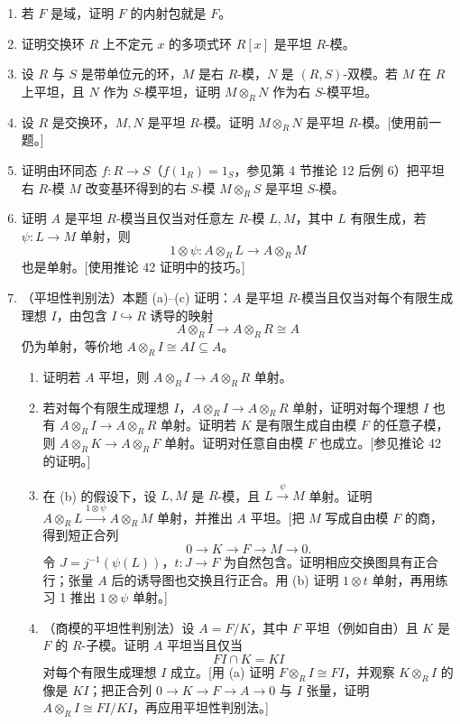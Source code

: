 \begin{enumerate}[label=\arabic*.]
	\item 若 $F$ 是域，证明 $F$ 的内射包就是 $F$。
	\item 证明交换环 $R$ 上不定元 $x$ 的多项式环 $R[x]$ 是平坦 $R$-模。
	\item 设 $R$ 与 $S$ 是带单位元的环，$M$ 是右 $R$-模，$N$ 是 $(R,S)$-双模。若 $M$ 在 $R$ 上平坦，且 $N$ 作为 $S$-模平坦，证明 $M\otimes_RN$ 作为右 $S$-模平坦。
	\item 设 $R$ 是交换环，$M,N$ 是平坦 $R$-模。证明 $M\otimes_RN$ 是平坦 $R$-模。[使用前一题。]
	\item 证明由环同态 $f:R\to S$（$f(1_R)=1_S$，参见第 4 节推论 12 后例 6）把平坦右 $R$-模 $M$ 改变基环得到的右 $S$-模 $M\otimes_RS$ 是平坦 $S$-模。
	\item 证明 $A$ 是平坦 $R$-模当且仅当对任意左 $R$-模 $L,M$，其中 $L$ 有限生成，若 $\psi:L\to M$ 单射，则
	\[
	1\otimes\psi:A\otimes_RL\longrightarrow A\otimes_RM
	\]
	也是单射。[使用推论 42 证明中的技巧。]
	\item （平坦性判别法）本题 (a)--(c) 证明：$A$ 是平坦 $R$-模当且仅当对每个有限生成理想 $I$，由包含 $I\hookrightarrow R$ 诱导的映射
	\[
	A\otimes_RI\longrightarrow A\otimes_RR\cong A
	\]
	仍为单射，等价地 $A\otimes_RI\cong AI\subseteq A$。
	\begin{enumerate}[label=(\alph*)]
		\item 证明若 $A$ 平坦，则 $A\otimes_RI\to A\otimes_RR$ 单射。
		\item 若对每个有限生成理想 $I$，$A\otimes_RI\to A\otimes_RR$ 单射，证明对每个理想 $I$ 也有 $A\otimes_RI\to A\otimes_RR$ 单射。证明若 $K$ 是有限生成自由模 $F$ 的任意子模，则 $A\otimes_RK\to A\otimes_RF$ 单射。证明对任意自由模 $F$ 也成立。[参见推论 42 的证明。]
		\item 在 (b) 的假设下，设 $L,M$ 是 $R$-模，且 $L\xrightarrow{\psi}M$ 单射。证明 $A\otimes_RL\xrightarrow{1\otimes\psi}A\otimes_RM$ 单射，并推出 $A$ 平坦。[把 $M$ 写成自由模 $F$ 的商，得到短正合列
		\[
		0\to K\to F\to M\to0.
		\]
		令 $J=j^{-1}(\psi(L))$，$t:J\to F$ 为自然包含。证明相应交换图具有正合行；张量 $A$ 后的诱导图也交换且行正合。用 (b) 证明 $1\otimes t$ 单射，再用练习 1 推出 $1\otimes\psi$ 单射。]
		\item （商模的平坦性判别法）设 $A=F/K$，其中 $F$ 平坦（例如自由）且 $K$ 是 $F$ 的 $R$-子模。证明 $A$ 平坦当且仅当
		\[
		FI\cap K=KI
		\]
		对每个有限生成理想 $I$ 成立。[用 (a) 证明 $F\otimes_RI\cong FI$，并观察 $K\otimes_RI$ 的像是 $KI$；把正合列 $0\to K\to F\to A\to0$ 与 $I$ 张量，证明 $A\otimes_RI\cong FI/KI$，再应用平坦性判别法。]
	\end{enumerate}

\end{enumerate}
